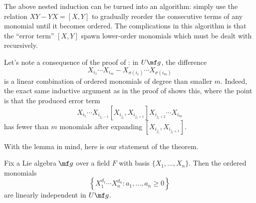 \documentclass[../notes.tex]{subfiles}
\begin{document}
\begin{remark}
	The above nested induction can be turned into an algorithm: simply use the relation $XY-YX=[X,Y]$ to gradually reorder the consecutive terms of any monomial until it becomes ordered. The complications in this algorithm is that the ``error term'' $[X,Y]$ spawn lower-order monomials which must be dealt with recursively.
\end{remark}
\begin{remark} \label{rem:spit-error-term}
	Let's note a consequence of the proof of : in $U\mf g$, the difference
	\[X_{i_1}\cdots X_{i_m}-X_{\sigma(i_1)}\cdots X_{\sigma(i_m)}\]
	is a linear combination of ordered monomials of degree than smaller $m$. Indeed, the exact same inductive argument as in the proof of  shows this, where the point is that the produced error term
	\[X_{i_1}\cdots X_{i_{j_\ell-1}}[X_{i_{j_\ell}},X_{i_{j_\ell+1}}]X_{i_{j_\ell+2}}\cdots X_{i_m}\]
	has fewer than $m$ monomials after expanding $[X_{i_{j_\ell}},X_{i_{j_\ell+1}}]$.
\end{remark}
With the lemma in mind, here is our statement of the theorem.
\begin{theorem} \label{thm:pbw}
	Fix a Lie algebra $\mf g$ over a field $F$ with basis $\{X_1,\ldots,X_n\}$. Then the ordered monomials
	\[\left\{X_1^{d_1}\cdots X_n^{d_n}:a_1,\ldots,a_n\ge0\right\}\]
	are linearly independent in $U\mf g$.
\end{theorem}
\end{document}
